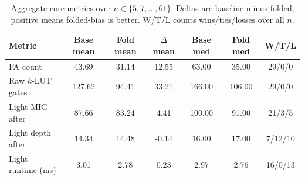 \begin{table}[t]
\centering
\scriptsize
\setlength{\tabcolsep}{3.5pt}
\renewcommand{\arraystretch}{1.05}
\caption{Aggregate core metrics over $n \in \{5,7,\dots,61\}$. Deltas are baseline minus folded; positive means folded-bias is better. W/T/L counts wins/ties/losses over all $n$.}
\label{tab:core_metrics_summary}
\begin{tabular}{l|ccc|cc|c}
\hline
Metric & Base mean & Fold mean & $\Delta$ mean & Base med & Fold med & W/T/L \\
\hline
FA count & 43.69 & 31.14 & 12.55 & 63.00 & 35.00 & 29/0/0 \\
Raw $k$-LUT gates & 127.62 & 94.41 & 33.21 & 166.00 & 106.00 & 29/0/0 \\
Light MIG after & 87.66 & 83.24 & 4.41 & 100.00 & 91.00 & 21/3/5 \\
Light depth after & 14.34 & 14.48 & -0.14 & 16.00 & 17.00 & 7/12/10 \\
Light runtime (ms) & 3.01 & 2.78 & 0.23 & 2.97 & 2.76 & 16/0/13 \\
\hline
\end{tabular}
\end{table}

